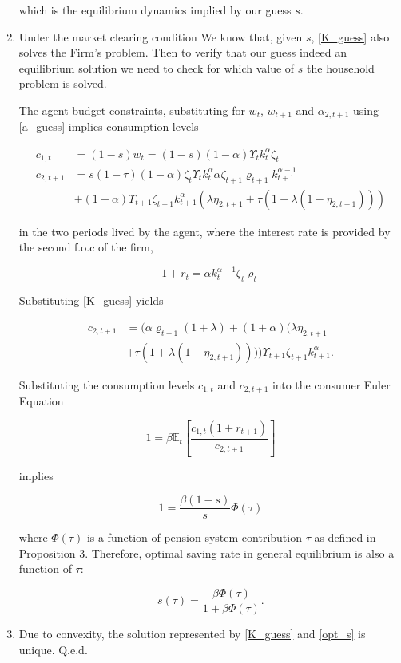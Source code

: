 \documentclass[12pt,a4paper]{article}
\begin{document}
\begin{enumerate}
  which is the equilibrium dynamics implied by our guess $s$.

  \item Under the market clearing condition We know that, given $s$, \ref{K_guess} also solves the Firm's problem. Then to verify that our guess indeed an equilibrium solution we need to check for which value of $s$ the household problem is solved.

  The agent budget constraints, substituting for $w_t$, $w_{t + 1}$ and $\alpha_{2, t+1}$ using \ref{a_guess} implies consumption levels

    \begin{align*}
      c_{1,t}& = (1 - s) w_t =(1 - s)(1 - \alpha) \Upsilon_t k_t^\alpha \zeta_t  \\
      c_{2,t+1} & = s(1 - \tau) (1 - \alpha)\zeta_{t} \Upsilon_t k_t^\alpha \alpha \zeta_{t+1} \varrho_{t+1} k_{t+1}^{\alpha - 1}   \\
      & + (1 - \alpha) \Upsilon_{t+1}\zeta_{t+1} k_{t+1}^{\alpha} (\lambda \eta_{2, t+1} + \tau (1 + \lambda(1 - \eta_{2, t+1})))
    \end{align*}

  in the two periods lived by the agent, where the interest rate is provided by the second f.o.c of the firm,

  \[
    1 + r_t = \alpha k_t^{\alpha - 1} \zeta_{t} \varrho_{t}
  \]

  Substituting \ref{K_guess} yields

    \begin{align*}
     c_{2,t+1} & = (\alpha \varrho_{t+1} (1 + \lambda) + (1 + \alpha)(\lambda \eta_{2, t+1}  \\
     & + \tau(1 + \lambda(1 - \eta_{2, t+1})))) \Upsilon_{t+1}\zeta_{t+1} k_{t+1}^{\alpha}.
    \end{align*}

  Substituting the consumption levels $c_{1,t}$ and $c_{2,t+1}$ into the consumer Euler Equation

    \[
      1 = \beta \mathbb{E}_t \left[ \frac{c_{1,t} (1+r_{t+1})}{c_{2,t+1}} \right]
    \]

  implies

    \[
    1 =  \frac{\beta(1 - s)}{s}\Phi(\tau)
    \]

  where $\Phi(\tau)$ is a function of pension system contribution $\tau$ as defined in Proposition 3. Therefore, optimal saving rate in general equilibrium is also a function of $\tau$:

    \begin{equation}
      s(\tau) = \frac{\beta \Phi(\tau)}{1 + \beta \Phi(\tau)}.
      \label{opt_s}
    \end{equation}

  \item Due to convexity, the solution represented by \ref{K_guess} and \ref{opt_s} is unique.  Q.e.d.

\end{enumerate}
\end{document}
